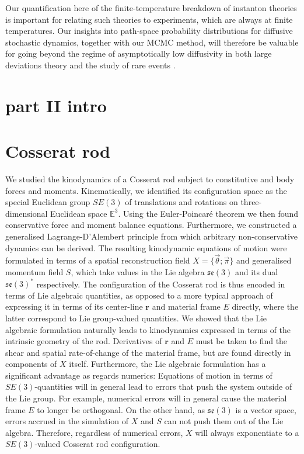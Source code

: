 \documentclass[]{cam-thesis}
\begin{document}
Our quantification here of the finite-temperature breakdown of instanton
theories is important for relating such theories to experiments, which
are always at finite temperatures. Our insights into path-space probability
distributions for diffusive stochastic dynamics, together with our
MCMC method, will therefore be valuable for going beyond the regime
of asymptotically low diffusivity in both large deviations theory
\citep{wentzellSmallRandomPerturbations1970, heymannGeometricMinimumAction2008a, gartnerModelingSimulationsPolymers2019}
and the study of rare events \citep{grafkeSharpAsymptoticEstimates2021}.


\section{part II intro}

\section{Cosserat rod}


We studied the kinodynamics of a Cosserat rod subject to constitutive and body forces and moments. Kinematically, we identified its configuration space as the special Euclidean group $SE(3)$ of translations and rotations on three-dimensional Euclidean space $\mathbb{E}^3$. Using the Euler-Poincaré theorem we then found conservative force and moment balance equations. Furthermore, we constructed a generalised Lagrange-D'Alembert principle from which arbitrary non-conservative dynamics can be derived. The resulting kinodynamic equations of motion were formulated in terms of a spatial reconstruction field $X = \{ \vec{\theta} ; \vec{\pi} \}$ and generalised momentum field $S$, which take values in the Lie algebra $\mathfrak{se}(3)$ and its dual $\mathfrak{se}(3)^*$ respectively. The configuration of the Cosserat rod is thus encoded in terms of Lie algebraic quantities, as opposed to a more typical approach of expressing it in terms of its center-line $\mathbf{r}$ and material frame $E$ directly, where the latter correspond to Lie group-valued quantities. We showed that the Lie algebraic formulation naturally leads to kinodynamics expressed in terms of the intrinsic geometry of the rod. Derivatives of $\mathbf{r}$ and $E$ must be taken to find the shear and spatial rate-of-change of the material frame, but are found directly in components of $X$ itself. Furthermore, the Lie algebraic formulation has a significant advantage as regards  numerics: Equations of motion in terms of $SE(3)$-quantities will in general lead to errors that push the system outside of the Lie group. For example, numerical errors will in general cause the material frame $E$ to longer be orthogonal. On the other hand, as $\mathfrak{se}(3)$ is a vector space, errors accrued in the simulation of $X$ and $S$ can not push them out of the Lie algebra. Therefore, regardless of numerical errors, $X$ will always exponentiate to a $SE(3)$-valued Cosserat rod configuration.
\end{document}
